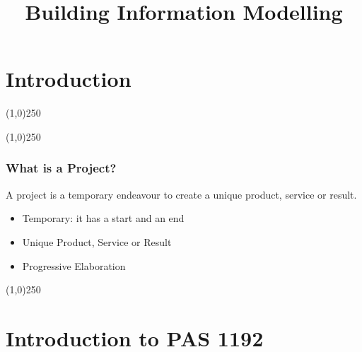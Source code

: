 



%
\title[Building Information Modelling]{Building Information Modelling}



%
\usetikzlibrary{arrows}



\newpage




\thispagestyle{empty}
\tableofcontents
\newpage
\section{Introduction}


\begin{frame}
\titlepage
\end{frame}\begin{center}\line(1,0){250}\end{center}
%
%
\begin{center}\line(1,0){250}\end{center}



\begin{frame}
\frametitle{What is a Project?}
A project is a temporary endeavour to create a unique product, service or result.\\
\begin{itemize}
\item Temporary: it has a start and an end
\item Unique Product, Service or Result
\item Progressive Elaboration
\end{itemize}
\end{frame}
\begin{center}\line(1,0){250}\end{center}



\section{Introduction to PAS 1192}

